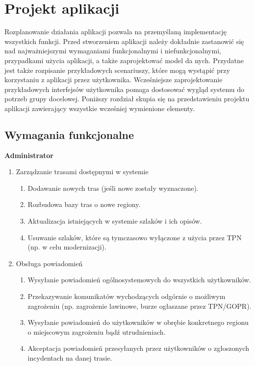 \section{Projekt aplikacji} 
Rozplanowanie działania aplikacji pozwala na przemyślaną implementację wszystkich funkcji. Przed stworzeniem aplikacji należy dokładnie zastanowić się nad najważniejszymi wymaganiami funkcjonalnymi i niefunkcjonalnymi, przypadkami użycia aplikacji, a także zaprojektować model da nych. Przydatne jest także rozpisanie przykładowych scenariuszy, które mogą wystąpić przy korzystaniu z aplikacji przez użytkownika. Wcześniejsze zaprojektowanie przykładowych interfejsów użytkownika pomaga dostosować wygląd systemu do potrzeb grupy docelowej. Poniższy rozdział skupia się na przedstawieniu projektu aplikacji zawierający wszystkie wcześniej wymienione elementy.
    \subsection{Wymagania funkcjonalne}
    \textbf{Administrator}
    \begin{enumerate}
        \item Zarządzanie trasami dostępnymi w systemie
        \begin{enumerate}
            \item Dodawanie nowych tras (jeśli nowe zostały wyznaczone).
            \item Rozbudowa bazy tras o nowe regiony.
            \item Aktualizacja istniejących w systemie szlaków i ich opisów.
            \item Usuwanie szlaków, które są tymczasowo wyłączone z użycia przez TPN (np. w celu modernizacji).
        \end{enumerate}
        \item Obsługa powiadomień
        \begin{enumerate}
            \item Wysyłanie powiadomień ogólnosystemowych do wszystkich użytkowników.
            \item Przekazywanie komunikatów wychodzących odgórnie o możliwym zagrożeniu (np. zagrożenie lawinowe, burze ogłaszane przez TPN/GOPR).
            \item Wysyłanie powiadomień do użytkowników w obrębie konkretnego regionu o miejscowym zagrożeniu bądź utrudnieniach.
            \item Akceptacja powiadomień przesyłanych przez użytkowników o zgłoszonych incydentach na danej trasie.
        \end{enumerate}
    \end{enumerate}
